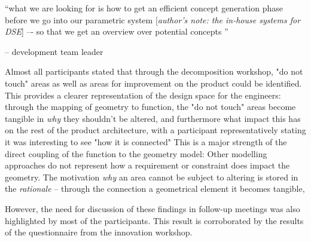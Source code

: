 \documentclass[preprints,article,accept,moreauthors,pdftex]{Definitions/mdpi}
\begin{document}
\begin{center}
    “what we are looking for is how to get an efficient concept generation phase before we go into our parametric system [\textit{author's note: the in-house systems for DSE}]  –- so that we get an overview over potential concepts ” 
\end{center}
\begin{flushright}
    -- development team leader
\end{flushright}




Almost all participants stated that through the decomposition workshop, "do not touch" areas as well as areas for improvement on the product could be identified.
This provides a clearer representation of the design space for the engineers: 
through the mapping of geometry to function, the "do not touch" areas become tangible in \textit{why} they shouldn't be altered, and furthermore what impact this has on the rest of the product architecture, with a participant representatively stating it was interesting to see "how it is connected"
This is a major strength of the direct coupling of the function to the geometry model:
Other modelling approaches do not represent how a requirement or constraint does impact the geometry.
The motivation \textit{why} an area cannot be subject to altering is stored in the \textit{rationale} -- through the connection a geometrical element it becomes tangible,


However, the need for discussion of these findings in follow-up meetings was also highlighted by most of the participants.
This result is corroborated by the results of the questionnaire from the innovation workshop.


\end{document}
